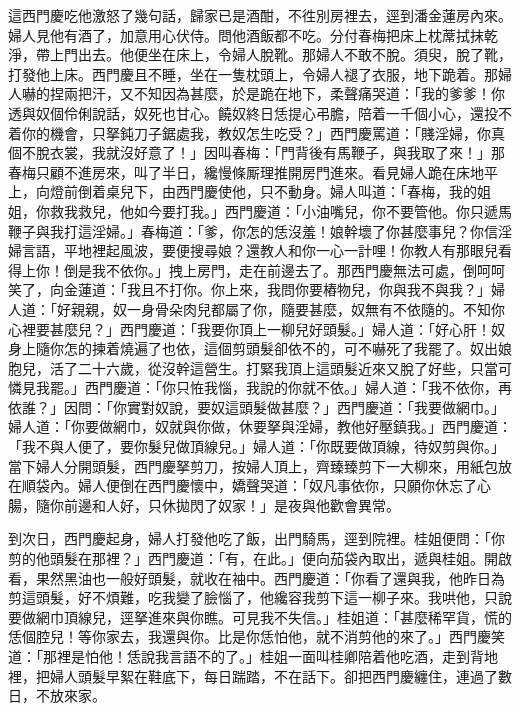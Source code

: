 這西門慶吃他激怒了幾句話，歸家已是酒酣，不徃別房裡去，逕到潘金蓮房內來。婦人見他有酒了，加意用心伏侍。問他酒飯都不吃。分付春梅把床上枕蓆拭抹乾淨，帶上門出去。他便坐在床上，令婦人脫靴。那婦人不敢不脫。須臾，脫了靴，打發他上床。西門慶且不睡，坐在一隻枕頭上，令婦人褪了衣服，地下跪着。{}那婦人嚇的捏兩把汗，又不知因為甚麼，於是跪在地下，柔聲痛哭道：「我的爹爹！你透與奴個伶俐說話，奴死也甘心。饒奴終日恁提心弔膽，陪着一千個小心，還投不着你的機會，只拏鈍刀子鋸處我，教奴怎生吃受？」西門慶罵道：「賤淫婦，你真個不脫衣裳，我就沒好意了！」因叫春梅：「門背後有馬鞭子，與我取了來！」{}那春梅只顧不進房來，叫了半日，纔慢條厮理{}推開房門進來。看見婦人跪在床地平上，向燈前倒着桌兒下，由西門慶使他，只不動身。婦人叫道：「春梅，我的姐姐，你救我救兒，他如今要打我。」西門慶道：「小油嘴兒，你不要管他。你只遞馬鞭子與我打這淫婦。」{}春梅道：「爹，你怎的恁沒羞！娘幹壞了你甚麼事兒？你信淫婦言語，平地裡起風波，要便搜尋娘？還教人和你一心一計哩！你教人有那眼兒看得上你！倒是我不依你。」拽上房門，走在前邊去了。那西門慶無法可處，倒呵呵笑了，{}向金蓮道：「我且不打你。你上來，我問你要樁物兒，你與我不與我？」{}婦人道：「好親親，奴一身骨朵肉兒都屬了你，{}隨要甚麼，奴無有不依隨的。不知你心裡要甚麼兒？」西門慶道：「我要你頂上一柳兒好頭髮。」婦人道：「好心肝！奴身上隨你怎的揀着燒遍了也依，這個剪頭髮卻依不的，可不嚇死了我罷了。奴出娘胞兒，活了二十六歲，從沒幹這營生。打緊我頂上這頭髮近來又脫了好些，{}只當可憐見我罷。」西門慶道：「你只恠我惱，我說的你就不依。」婦人道：「我不依你，再依誰？」因問：「你實對奴說，要奴這頭髮做甚麼？」西門慶道：「我要做網巾。」婦人道：「你要做網巾，奴就與你做，休要拏與淫婦，教他好壓鎮我。」西門慶道：「我不與人便了，要你髮兒做頂線兒。」婦人道：「你既要做頂線，待奴剪與你。」當下婦人分開頭髮，西門慶拏剪刀，按婦人頂上，齊臻臻剪下一大柳來，用紙包放在順袋內。{}婦人便倒在西門慶懷中，嬌聲哭道：「奴凡事依你，只願你休忘了心腸，隨你前邊和人好，只休拋閃了奴家！」是夜與他歡會異常。

到次日，西門慶起身，婦人打發他吃了飯，出門騎馬，逕到院裡。桂姐便問：「你剪的他頭髮在那裡？」西門慶道：「有，在此。」便向茄袋內取出，遞與桂姐。開啟看，果然黑油也一般好頭髮，{}就收在袖中。西門慶道：「你看了還與我，他昨日為剪這頭髮，好不煩難，吃我變了臉惱了，他纔容我剪下這一柳子來。我哄他，只說要做網巾頂線兒，逕拏進來與你瞧。可見我不失信。」桂姐道：「甚麼稀罕貨，慌的恁個腔兒！等你家去，我還與你。比是你恁怕他，就不消剪他的來了。」{}西門慶笑道：「那裡是怕他！恁說我言語不的了。」桂姐一面叫桂卿陪着他吃酒，走到背地裡，把婦人頭髮早絮在鞋底下，每日踹踏，{}不在話下。卻把西門慶纏住，連過了數日，不放來家。

